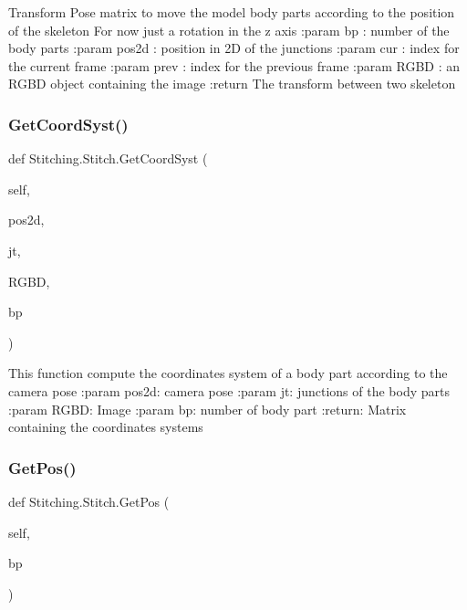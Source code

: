 \begin{DoxyVerb}Transform Pose matrix to move the model body parts according to the position of the skeleton
For now just a rotation in the z axis
:param bp : number of the body parts
:param pos2d : position in 2D of the junctions
:param cur : index for the current frame
:param prev : index for the previous frame
:param RGBD : an RGBD object containing the image
:return The transform between two skeleton
\end{DoxyVerb}
 \mbox{\label{class_stitching_1_1_stitch_ae2a91306c029bcd2b6631a64d662cbff}} 
\subsubsection{\texorpdfstring{Get\+Coord\+Syst()}{GetCoordSyst()}}
{\footnotesize\ttfamily def Stitching.\+Stitch.\+Get\+Coord\+Syst (\begin{DoxyParamCaption}\item[{}]{self,  }\item[{}]{pos2d,  }\item[{}]{jt,  }\item[{}]{R\+G\+BD,  }\item[{}]{bp }\end{DoxyParamCaption})}

\begin{DoxyVerb}This function compute the coordinates system of a body part according to the camera pose
:param pos2d: camera pose
:param jt: junctions of the body parts
:param RGBD: Image
:param bp: number of body part
:return: Matrix containing the coordinates systems
\end{DoxyVerb}
 \mbox{\label{class_stitching_1_1_stitch_a0ba4c013f984b9b0fa636a2d120094d2}} 
\subsubsection{\texorpdfstring{Get\+Pos()}{GetPos()}}
{\footnotesize\ttfamily def Stitching.\+Stitch.\+Get\+Pos (\begin{DoxyParamCaption}\item[{}]{self,  }\item[{}]{bp }\end{DoxyParamCaption})}

